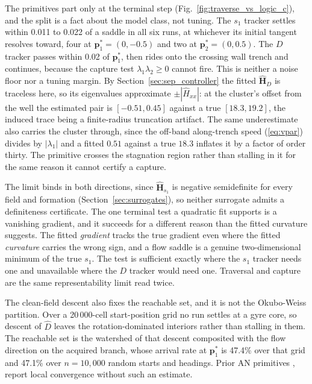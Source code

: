 \documentclass[lettersize,journal]{IEEEtran}
\begin{document}
The primitives part only at the terminal step
(Fig.~\ref{fig:traverse_vs_logic_c}), and the split is a fact about the
model class, not tuning. The $s_1$ tracker
settles within 0.011 to 0.022 of a saddle in all six runs, at whichever
its initial tangent resolves toward, four at
$\mathbf{p}^*_1 = (0, -0.5)$ and two at $\mathbf{p}^*_2 = (0, 0.5)$. The
$D$ tracker passes within 0.02 of $\mathbf{p}^*_1$, then rides onto the
crossing wall trench and continues, because the capture test
$\lambda_1\lambda_2 \geq 0$ cannot fire. This
is neither a noise floor nor a tuning margin. By
Section~\ref{sec:sep_controller} the fitted $\hat{\mathbf{H}}_D$ is
traceless here, so its eigenvalues approximate
$\pm|\hat{H}_{xx}|$: at the cluster's offset from the well the estimated
pair is $[-0.51, 0.45]$ against a true $[18.3, 19.2]$, the induced trace
being a finite-radius truncation artifact. The same underestimate also
carries the cluster through, since the off-band along-trench speed
(\ref{eq:vpar}) divides by $|\lambda_1|$ and a fitted $0.51$ against a
true $18.3$ inflates it by a factor of order thirty. The primitive
crosses the stagnation region rather than stalling in it for the same
reason it cannot certify a capture.

The limit binds in both directions, since $\hat{\mathbf{H}}_{s_1}$
is negative semidefinite for every field and formation
(Section~\ref{sec:surrogates}), so neither surrogate admits a definiteness
certificate. The one terminal test a quadratic fit supports is a vanishing gradient, and it succeeds for a different reason than the fitted curvature suggests. The fitted \emph{gradient} tracks the true gradient even where the fitted \emph{curvature} carries the wrong sign, and a flow saddle is a genuine two-dimensional minimum of the true $s_1$. The test is sufficient exactly where the $s_1$ tracker needs one
and unavailable where the $D$ tracker would need one. Traversal and
capture are the same representability limit read twice.

The clean-field descent also fixes the reachable set, and it is not the
Okubo-Weiss partition. Over a 20\,000-cell start-position grid no run
settles at a gyre core, so descent of $\hat{D}$ leaves the
rotation-dominated interiors rather than stalling in them. The
reachable set is the watershed of that descent composited with the flow
direction on the acquired branch, whose arrival rate at
$\mathbf{p}^*_1$ is 47.4\% over that grid and 47.1\% over $n =
10{,}000$ random starts and headings. Prior AN primitives
\cite{2}, \cite{3} report local convergence without such an estimate.
\end{document}
